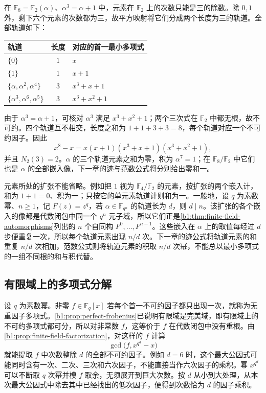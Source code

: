 在 \(\mathbb F_8=\mathbb F_2(\alpha)\)、\(\alpha^3=\alpha+1\) 中，元素在 \(\mathbb F_2\) 上的次数只能是三的除数。除 \(0,1\) 外，剩下六个元素的次数都为三，故平方映射将它们分成两个长度为三的轨道。全部轨道如下：
\begin{center}
	\begin{tabular}{@{}lcl@{}}
		\toprule
		轨道 & 长度 & 对应的首一最小多项式 \\
		\midrule
		\(\{0\}\) & \(1\) & \(x\) \\
		\(\{1\}\) & \(1\) & \(x+1\) \\
		\(\{\alpha,\alpha^2,\alpha^4\}\) & \(3\) & \(x^3+x+1\) \\
		\(\{\alpha^3,\alpha^6,\alpha^5\}\) & \(3\) & \(x^3+x^2+1\) \\
		\bottomrule
	\end{tabular}
\end{center}
由于 \(\alpha^3=\alpha+1\)，可核对 \(\alpha^3\) 满足 \(x^3+x^2+1\)；两个三次式在 \(\mathbb F_2\) 中都无根，故不可约。四个轨道互不相交，长度之和为 \(1+1+3+3=8\)，每个轨道对应一个不可约因子。因此
\[
	x^8-x=x(x+1)(x^3+x+1)(x^3+x^2+1),
\]
并且 \(N_2(3)=2\)。\(\alpha\) 的三个轨道元素之和为零，积为 \(\alpha^7=1\)；在 \(\mathbb F_8/\mathbb F_2\) 中它们也是 \(\alpha\) 的全部嵌入像，下一章的迹与范数公式将分别给出零和一。

\ProseParagraphBreak
元素所处的扩张不能省略。例如把 \(1\) 视为 \(\mathbb F_4/\mathbb F_2\) 的元素，按扩张的两个嵌入计，和为 \(1+1=0\)、积为一；只按它的单元素轨道计则和为一。一般地，设 \(q\) 为素数幂、\(n\geq1\)，记 \(F(z)=z^q\)，若 \(\alpha\in\mathbb F_{q^n}\) 的轨道长为 \(d\)，则 \(d\mid n\)。该扩张的各个嵌入的像都是代数闭包中同一个 \(q^n\) 元子域，所以它们正是\cref{b1:thm:finite-field-automorphisms}列出的 \(n\) 个自同构 \(F^0,\ldots,F^{n-1}\)。这些嵌入在 \(\alpha\) 上的取值每经过 \(d\) 步便重复一次，所以每个轨道元素出现 \(n/d\) 次。下一章的迹公式将轨道元素的和重复 \(n/d\) 次相加，范数公式则将轨道元素的积取 \(n/d\) 次幂，不能总以最小多项式的一组不同根的和与积代替。

\subsection{有限域上的多项式分解}
\label{b1:subsec:1704:02}

设 \(q\) 为素数幂。非零 \(f\in\mathbb F_q[x]\) 若每个首一不可约因子都只出现一次，就称为无重因子多项式。\cref{b1:prop:perfect-frobenius}已说明有限域是完美域，即有限域上的不可约多项式都可分，所以对非常数 \(f\)，这等价于 \(f\) 在代数闭包中没有重根。由\cref{b1:prop:finite-field-factorization}，对这样的 \(f\) 计算
\[
	\gcd\bigl(f,x^{q^d}-x\bigr)
\]
就能提取 \(f\) 中次数整除 \(d\) 的全部不可约因子。例如 \(d=6\) 时，这个最大公因式可能同时含有一次、二次、三次和六次因子，不能直接当作六次因子的乘积。幂 \(x^{q^d}\) 可以不断取 \(q\) 次幂并模 \(f\) 取余，无须展开到巨大次数。按 \(d\) 从小到大处理，从本次最大公因式中除去其中已经找出的低次因子，便得到次数恰为 \(d\) 的因子乘积。

